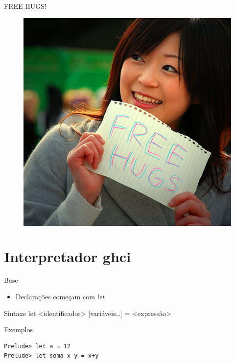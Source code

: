 \documentclass{beamer}
\begin{document}
	\begin{frame}{FREE HUGS!}
	 \begin{figure}
	  \includegraphics[height=0.8\textheight]{freeHugs.jpg}
	 \end{figure}

	\end{frame}

	
\section{Interpretador ghci}

		\begin{frame}{}
		\end{frame}

	\begin{frame}[fragile]{Base}
	 	 \begin{itemize}
	 	  \item Declarações começam com \textit{let}
	 	 \end{itemize}
	 	 \begin{block}{Sintaxe}
	 	  let <identificador> {[}variáveis\dots{]} = <expressão>
	 	 \end{block}
	 	 \begin{block}{Exemplos}
	 	  \begin{lstlisting}
Prelude> let a = 12
Prelude> let soma x y = x+y
	 	  \end{lstlisting}
	 	 \end{block}
	\end{frame}
	
\end{document}
